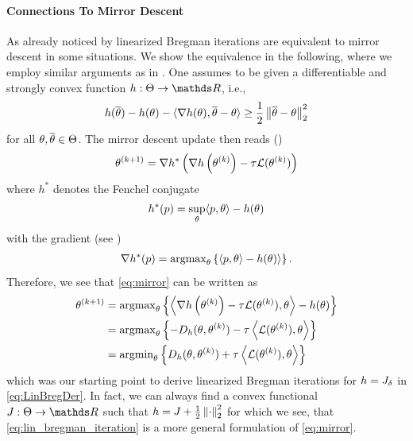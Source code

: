 \paragraph{Connections To Mirror Descent}
As already noticed by \cite{villa2023implicit} linearized Bregman iterations are equivalent to mirror descent in some situations. We show the equivalence in the following, where we employ similar arguments as in \cite{beck2003mirror}.
%
One assumes to be given a differentiable and strongly convex function $h:\Param\to\R$, i.e.,
%
\begin{align*}
h(\overline{\theta}) - h(\theta) - \langle\nabla h(\theta), \overline{\theta} - \theta \rangle \geq  
\frac{1}{2} \left\|\overline{\theta} - \theta\right\|^2_2
\end{align*}
%
for all $\theta,\overline{\theta}\in\Theta$. The mirror descent update then reads (\cite{nemirovskij1983problem, beck2003mirror})
%
\begin{align}\label{eq:mirror}
\theta^{(k+1)} = \nabla h^\ast\left(\nabla h\left(\theta^{(k)}\right) - \tau \mathcal{L}(\theta^{(k)})\right)
\end{align}
%
where $h^\ast$ denotes the Fenchel conjugate
%
\begin{align*}
h^\ast(p) = \sup_{\theta} \langle p, \theta\rangle - h(\theta)
\end{align*}
%
with the gradient (see \cite{boyd2004convex})
%
\begin{align*}
\nabla h^\ast(p) = \operatorname{argmax}_{\theta} \left\{ \langle p, \theta\rangle - h(\theta)\rangle\right\}.
\end{align*}
%
Therefore, we see that \cref{eq:mirror} can be written as
%
\begin{align*}
\theta^{(k+1)} &= \operatorname{argmax}_\theta
\left\{\left\langle\nabla h\left(\theta^{(k)}\right) - \tau \mathcal{L}(\theta^{(k)}), \theta \right\rangle - h(\theta)\right\}\\
&=
\operatorname{argmax}_\theta \left\{-D_h(\theta, \theta^{(k)})-\tau\left\langle \mathcal{L}(\theta^{(k)}), \theta \right\rangle\right\}\\
&=
\operatorname{argmin}_\theta \left\{D_h(\theta, \theta^{(k)})+\tau\left\langle \mathcal{L}(\theta^{(k)}), \theta \right\rangle\right\}
\end{align*}
%
which was our starting point to derive linearized Bregman iterations for $h=J_{\delta}$ in \cref{eq:LinBregDer}. In fact, we can always find a convex functional $\func:\Theta\to\R$ such that $h = J + \frac{1}{2}\left\|\cdot\right\|_2^2$ for which we see, that \cref{eq:lin_bregman_iteration} is a more general formulation of \cref{eq:mirror}.
%
%
